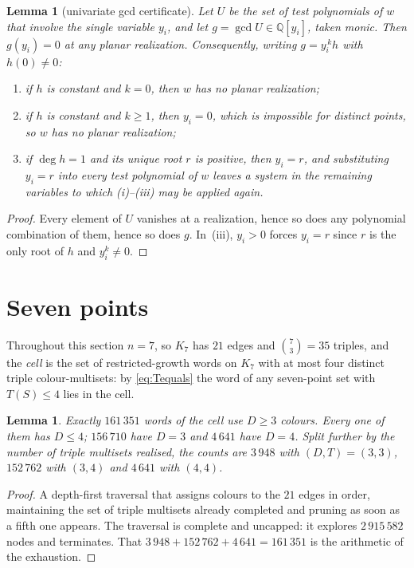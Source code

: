 \documentclass[11pt]{amsart}
\numberwithin{theorem}{section}
\newtheorem{lemma}[theorem]{Lemma}
\theoremstyle{remark}
\theoremstyle{definition}
\newcommand{\Tcount}{T}
\begin{document}
\begin{lemma}[univariate gcd certificate]\label{lem:gcd}
Let $U$ be the set of test polynomials of $w$ that involve the single variable
$y_i$, and let $g=\gcd U\in\mathbb Q[y_i]$, taken monic. Then $g(y_i)=0$ at any
planar realization. Consequently, writing $g=y_i^{\,k}h$ with $h(0)\ne0$:
\begin{enumerate}
\item[(i)] if $h$ is constant and $k=0$, then $w$ has no planar realization;
\item[(ii)] if $h$ is constant and $k\ge1$, then $y_i=0$, which is impossible
  for distinct points, so $w$ has no planar realization;
\item[(iii)] if $\deg h=1$ and its unique root $r$ is positive, then $y_i=r$,
  and substituting $y_i=r$ into every test polynomial of $w$ leaves a system in
  the remaining variables to which (i)--(iii) may be applied again.
\end{enumerate}
\end{lemma}

\begin{proof}
Every element of $U$ vanishes at a realization, hence so does any polynomial
combination of them, hence so does $g$. In~(iii), $y_i>0$ forces $y_i=r$ since
$r$ is the only root of $h$ and $y_i^k\ne0$.
\end{proof}

\section{Seven points}\label{sec:seven}

Throughout this section $n=7$, so $K_7$ has $21$ edges and
$\binom73=35$ triples, and the \emph{cell} is the set of restricted-growth words
on $K_7$ with at most four distinct triple colour-multisets: by
\eqref{eq:Tequals} the word of any seven-point set with $\Tcount(S)\le4$ lies in
the cell.

\begin{lemma}\label{lem:census}
Exactly $161\,351$ words of the cell use $D\ge3$ colours. Every one of them has
$D\le4$; $156\,710$ have $D=3$ and $4\,641$ have $D=4$. Split further by the
number of triple multisets realised, the counts are $3\,948$ with $(D,\Tcount)=(3,3)$,
$152\,762$ with $(3,4)$ and $4\,641$ with $(4,4)$.
\end{lemma}

\begin{proof}
A depth-first traversal that assigns colours to the $21$ edges in order,
maintaining the set of triple multisets already completed and pruning as soon as
a fifth one appears. The traversal is complete and uncapped: it explores
$2\,915\,582$ nodes and terminates. That $3\,948+152\,762+4\,641=161\,351$ is
the arithmetic of the exhaustion.
\end{proof}
\end{document}
